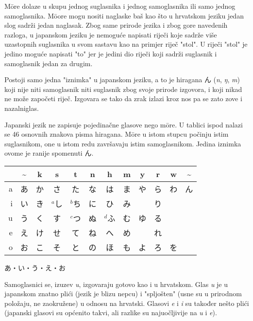 	M\={o}re dolaze u skupu jednog suglasnika i jednog samoglasnika ili samo jednog samoglasnika. M\={o}ore mogu nositi naglaske baš kao što u hrvatskom jeziku jedan slog sadrži jedan naglasak. Zbog same prirode jezika i zbog gore navedenih razloga, u japanskom jeziku je nemoguće napisati riječi koje sadrže više uzastopnih suglasnika u svom sastavu kao na primjer riječ "stol". U riječi "stol" je jedino moguće napisati "to" jer je jedini dio riječi koji sadrži suglasnik i samoglasnik jedan za drugim.
	
	Postoji samo jedna "iznimka" u japanskom jeziku, a to je hiragana ん (\textit{n}, \textit{ŋ}, \textit{m}) koji nije niti samoglasnik niti suglasnik zbog svoje prirode izgovora, i koji nikad ne može započeti riječ. Izgovara se tako da zrak izlazi kroz nos pa se zato zove i nazalni\footnotemark[1] glas.
	
	
	
	Japanski jezik ne zapisuje pojedinačne glasove nego m\={o}re. U tablici ispod nalazi se 46 osnovnih znakova pisma hiragana. M\={o}re u istom stupcu počinju istim suglasnikom, one u istom redu završavaju istim samoglasnikom. Jedina iznimka ovome je ranije spomenuti ん.
	
	\setlength{\tabcolsep}{10pt}
	\vspace{10pt}
	\begin{tabular}{|r|c|c|c|c|c|c|c|c|c|c|c|}
		\hline
		&\textasciitilde&k&s&t&n&h&m&y&r&w&\textasciitilde\\
		\hline
		a&あ&か&さ&た&な&は&ま&や&ら&わ&ん\\
		i&い&き&$^a$し&$^b$ち&に&ひ&み&&り&&\\
		u&う&く&す&$^c$つ&ぬ&$^d$ふ&む&ゆ&る&&\\
		e&え&け&せ&て&ね&へ&め&&れ&&\\
		o&お&こ&そ&と&の&ほ&も&よ&ろ&を&\\
		\hline
	\end{tabular}
	\setlength{\tabcolsep}{6pt}
	
	
	\noindent\ten あ・い・う・え・お
	
	Samoglasnici se, izuzev \textit{u}, izgovaraju gotovo kao i u hrvatskom. Glas \textit{u} je u japanskom znatno plići (jezik je blizu nepcu) i "spljošten" (usne su u prirodnom položaju, ne zaokružene) u odnosu na hrvatski. Glasovi \textit{e} i \textit{i} su također nešto plići (japanski glasovi su općenito takvi, ali razlike su najuočljivije na \textit{u} i \textit{e}).
	
